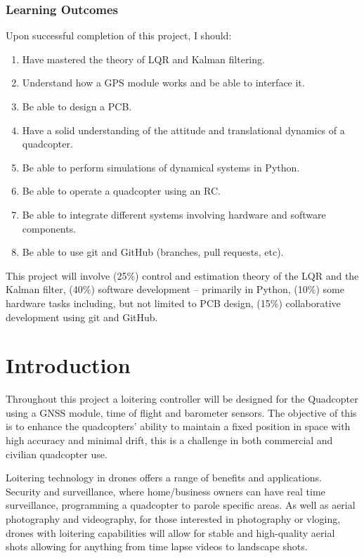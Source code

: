 \documentclass{report}
\begin{document}
\subsection*{Learning Outcomes}
Upon successful completion of this project, I should:
\begin{enumerate}
    \item Have mastered the theory of LQR and Kalman filtering.
    \item Understand how a GPS module works and be able to interface it.
    \item Be able to design a PCB.
    \item Have a solid understanding of the attitude and translational dynamics
    of a quadcopter.
    \item Be able to perform simulations of dynamical systems in Python.
    \item Be able to operate a quadcopter using an RC.
    \item Be able to integrate different systems involving hardware and software
    components.
    \item Be able to use git and GitHub (branches, pull requests, etc).
\end{enumerate}
This project will involve (25\%) control and estimation theory of the LQR and
the Kalman filter, (40\%) software development – primarily in Python, (10\%)
some hardware tasks including, but not limited to PCB design, (15\%)
collaborative development using git and GitHub.

\newpage
\tableofcontents
\newpage


\chapter{Introduction}
Throughout this project a loitering controller will be designed for the
Quadcopter using a GNSS module, time of flight and barometer sensors. The objective of this is to enhance the quadcopters' ability to maintain a fixed position in space with high accuracy and minimal drift, this is a challenge in both commercial and civilian quadcopter use.

Loitering technology in drones offers a range of benefits and applications.
Security and surveillance, where home/business owners can have real time
surveillance, programming a quadcopter to parole specific areas. As well as
aerial photography and videography, for those interested in photography or
vloging, drones with loitering capabilities will allow for stable and
high-quality aerial shots allowing for anything from time lapse videos to
landscape shots.
\end{document}
